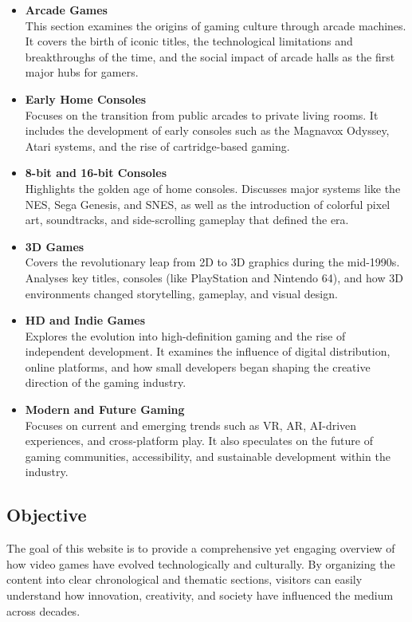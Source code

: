 \documentclass[a4paper,12pt]{article}
\begin{document}
\begin{itemize}[leftmargin=1.2cm]
    \item \textbf{Arcade Games} \\
    This section examines the origins of gaming culture through arcade machines.  
    It covers the birth of iconic titles, the technological limitations and breakthroughs of the time, and the social impact of arcade halls as the first major hubs for gamers.

    \item \textbf{Early Home Consoles} \\
    Focuses on the transition from public arcades to private living rooms.  
    It includes the development of early consoles such as the Magnavox Odyssey, Atari systems, and the rise of cartridge-based gaming.

    \item \textbf{8-bit and 16-bit Consoles} \\
    Highlights the golden age of home consoles.  
    Discusses major systems like the NES, Sega Genesis, and SNES, as well as the introduction of colorful pixel art, soundtracks, and side-scrolling gameplay that defined the era.

    \item \textbf{3D Games} \\
    Covers the revolutionary leap from 2D to 3D graphics during the mid-1990s.  
    Analyses key titles, consoles (like PlayStation and Nintendo 64), and how 3D environments changed storytelling, gameplay, and visual design.

    \item \textbf{HD and Indie Games} \\
    Explores the evolution into high-definition gaming and the rise of independent development.  
    It examines the influence of digital distribution, online platforms, and how small developers began shaping the creative direction of the gaming industry.

    \item \textbf{Modern and Future Gaming} \\
    Focuses on current and emerging trends such as VR, AR, AI-driven experiences, and cross-platform play.  
    It also speculates on the future of gaming communities, accessibility, and sustainable development within the industry.
\end{itemize}

\vspace{0.5cm}
\subsection*{Objective}
The goal of this website is to provide a comprehensive yet engaging overview of how video games have evolved technologically and culturally.  
By organizing the content into clear chronological and thematic sections, visitors can easily understand how innovation, creativity, and society have influenced the medium across decades.
\end{document}
